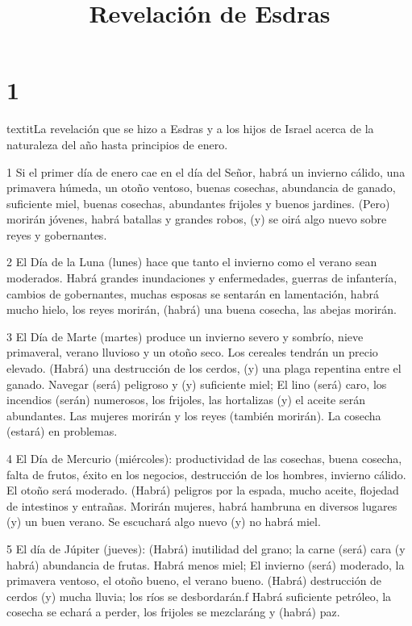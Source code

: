 

\title{Revelación de Esdras}

\chapter{1}

\par textit{La revelación que se hizo a Esdras y a los hijos de Israel acerca de la naturaleza del año hasta principios de enero.}

\par 1 Si el primer día de enero cae en el día del Señor, habrá un invierno cálido, una primavera húmeda, un otoño ventoso, buenas cosechas, abundancia de ganado, suficiente miel, buenas cosechas, abundantes frijoles y buenos jardines. (Pero) morirán jóvenes, habrá batallas y grandes robos, (y) se oirá algo nuevo sobre reyes y gobernantes.

\par 2 El Día de la Luna (lunes) hace que tanto el invierno como el verano sean moderados. Habrá grandes inundaciones y enfermedades, guerras de infantería, cambios de gobernantes, muchas esposas se sentarán en lamentación, habrá mucho hielo, los reyes morirán, (habrá) una buena cosecha, las abejas morirán.

\par 3 El Día de Marte (martes) produce un invierno severo y sombrío, nieve primaveral, verano lluvioso y un otoño seco. Los cereales tendrán un precio elevado. (Habrá) una destrucción de los cerdos, (y) una plaga repentina entre el ganado. Navegar (será) peligroso y (y) suficiente miel; El lino (será) caro, los incendios (serán) numerosos, los frijoles, las hortalizas (y) el aceite serán abundantes. Las mujeres morirán y los reyes (también morirán). La cosecha (estará) en problemas.

\par 4 El Día de Mercurio (miércoles): productividad de las cosechas, buena cosecha, falta de frutos, éxito en los negocios, destrucción de los hombres, invierno cálido. El otoño será moderado. (Habrá) peligros por la espada, mucho aceite, flojedad de intestinos y entrañas. Morirán mujeres, habrá hambruna en diversos lugares (y) un buen verano. Se escuchará algo nuevo (y) no habrá miel.

\par 5 El día de Júpiter (jueves): (Habrá) inutilidad del grano; la carne (será) cara (y habrá) abundancia de frutas. Habrá menos miel; El invierno (será) moderado, la primavera ventoso, el otoño bueno, el verano bueno. (Habrá) destrucción de cerdos (y) mucha lluvia; los ríos se desbordarán.f Habrá suficiente petróleo, la cosecha se echará a perder, los frijoles se mezclaráng y (habrá) paz.

